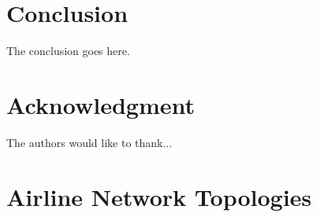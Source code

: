 \documentclass[10pt]{article}
\begin{document}
%
%
%
%
%
%
%

\section{Conclusion}
The conclusion goes here.

\section*{Acknowledgment}
The authors would like to thank...

\appendix

\section{Airline Network Topologies}
\end{document}
